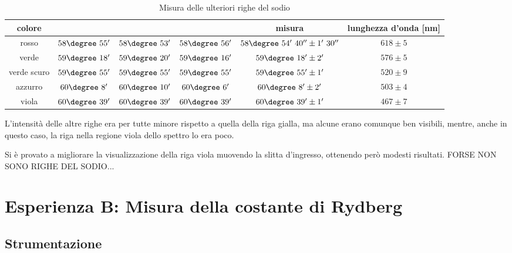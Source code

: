 \documentclass[a4paper,10pt]{article}
\begin{document}
{{{{{{\begin{table}[H]
	\centering
	\begin{tabular}{c|c|c|c|c|c}
		colore &	&	&	& misura & lunghezza d'onda [nm]\\
		\hline
		rosso &	$58\degree~55'$ & $58\degree~53'$ & $58\degree~56'$ & $58\degree~54'~40'' \pm 1'~30''$ & $618 \pm 5$\\
		verde & $59\degree~18'$ & $59\degree~20'$ & $59\degree~16'$ & $59\degree~18' \pm 2'$  & $576 \pm 5$\\
		verde scuro & $59\degree~55'$ & $59\degree~55'$ & $59\degree~55'$ & $59\degree~55' \pm 1'$ & $520 \pm 9$\\
		azzurro & $60\degree~8'$ & $60\degree~10'$ & $60\degree~6'$ & $60\degree~8' \pm 2'$& $503 \pm 4$\\
		viola & $60\degree~39'$ & $60\degree~39'$ & $60\degree~39'$ & $60\degree~39' \pm 1'$ & $467 \pm 7$\\	
	\end{tabular}
	\caption{Misura delle ulteriori righe del sodio}
	\label{tab:moreNa}
\end{table}

L'intensità delle altre righe era per tutte minore rispetto a quella della riga gialla, ma alcune erano comunque ben visibili, mentre, anche in questo caso, la riga nella regione viola dello spettro lo era poco.

Si è provato a migliorare la visualizzazione della riga viola muovendo la slitta d'ingresso, ottenendo però modesti risultati.
FORSE NON SONO RIGHE DEL SODIO...%


\section{Esperienza B: Misura della costante di Rydberg}

\subsection{Strumentazione}

}}}}}}
\end{document}
